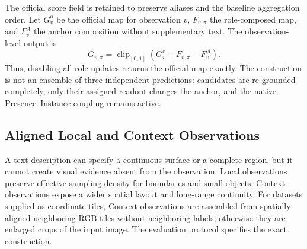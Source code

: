 The official score field is retained to preserve aliases and the baseline aggregation order. Let $G_v^{\mathrm{o}}$ be the official map for observation $v$, $F_{v,\pi}$ the role-composed map, and $F_v^A$ the anchor composition without supplementary text. The observation-level output is
\begin{equation}
G_{v,\pi}=\operatorname{clip}_{[0,1]}\!\left(G_v^{\mathrm{o}}+F_{v,\pi}-F_v^A\right).
\label{eq:official-compensation}
\end{equation}
Thus, disabling all role updates returns the official map exactly. The construction is not an ensemble of three independent predictions: candidates are re-grounded completely, only their assigned readout changes the anchor, and the native Presence--Instance coupling remains active.

\subsection{Aligned Local and Context Observations}

A text description can specify a continuous surface or a complete region, but it cannot create visual evidence absent from the observation. Local observations preserve effective sampling density for boundaries and small objects; Context observations expose a wider spatial layout and long-range continuity. For datasets supplied as coordinate tiles, Context observations are assembled from spatially aligned neighboring RGB tiles without neighboring labels; otherwise they are enlarged crops of the input image. The evaluation protocol specifies the exact construction.

